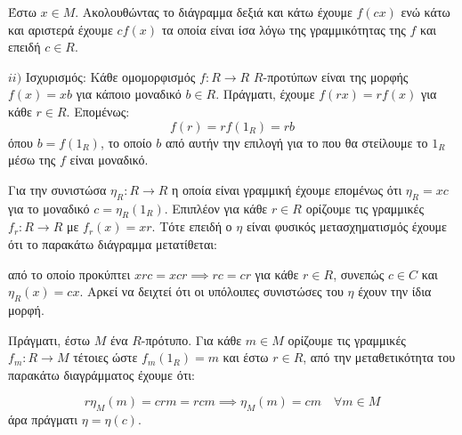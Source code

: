 \documentclass{article}
\begin{document}
\begin{enumerate}
		Έστω $x \in M$. Ακολουθώντας το διάγραμμα δεξιά και κάτω έχουμε $f(cx)$ ενώ κάτω και αριστερά έχουμε $cf(x)$ τα οποία είναι ίσα λόγω της γραμμικότητας της $f$ και επειδή $c \in R$.
		$ $\newline


		$ii)$ Ισχυρισμός: Κάθε ομομορφισμός $f: R\rightarrow R$ $R$-προτύπων είναι της μορφής $f(x) = xb$ για κάποιο μοναδικό $b \in R$.
		Πράγματι, έχουμε $f(rx) = rf(x)$ για κάθε $r \in R$. Επομένως:
		$$f(r) = rf(1_R) = rb$$
		όπου $b = f(1_R)$, το οποίο $b$ από αυτήν την επιλογή για το που θα στείλουμε το $1_R$ μέσω της $f$ είναι μοναδικό.
		$ $\newline

		Για την συνιστώσα $\eta_R :R \rightarrow R$ η οποία είναι γραμμική έχουμε επομένως ότι $\eta_R = xc$ για το μοναδικό $c = \eta_R(1_R)$. Επιπλέον για κάθε $r \in R$ ορίζουμε τις γραμμικές $f_r : R \rightarrow R$ με $f_r (x) = xr$. Τότε επειδή ο $\eta$ είναι φυσικός μετασχηματισμός έχουμε ότι το παρακάτω διάγραμμα μετατίθεται:

		\begin{center}
		\end{center}
		
		από το οποίο προκύπτει $xrc = xcr \implies rc=cr$ για κάθε $r \in R$, συνεπώς $c \in C$ και $\eta_R (x) = cx$. Αρκεί να δειχτεί ότι οι υπόλοιπες συνιστώσες του $\eta$ έχουν την ίδια μορφή.

		Πράγματι, έστω $M$ ένα $R$-πρότυπο. Για κάθε $m \in M$ ορίζουμε τις γραμμικές $f_m : R \rightarrow M$ τέτοιες ώστε $f_m (1_R) = m$ και έστω $r \in R$, από την μεταθετικότητα του παρακάτω διαγράμματος έχουμε ότι:

		\begin{center}
		\end{center}

		$$r \eta_M (m) = crm = rcm \implies \eta_M (m) = cm \quad \forall m \in M$$
		άρα πράγματι $\eta = \eta (c)$.
		$ $\newline



\end{enumerate}
\end{document}

